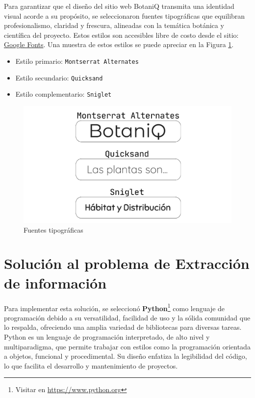 Para garantizar que el diseño del sitio web BotaniQ transmita una identidad visual acorde a su 
propósito, se seleccionaron fuentes tipográficas que equilibran profesionalismo, claridad y frescura, 
alineadas con la temática botánica y científica del proyecto. Estos estilos son accesibles
libre de costo desde el sitio: \href{https://fonts.google.com/}{Google Fonts}. 
Una muestra de estos estilos se puede apreciar en la Figura \ref{fig:fonts}.

\begin{itemize}
    \item Estilo primario: \texttt{Montserrat Alternates}
    \item Estilo secundario: \texttt{Quicksand}
    \item Estilo complementario: \texttt{Sniglet}
\end{itemize}


\begin{figure}[ht!]
    \centering
    \includegraphics[width=1\textwidth]{Images/fonts.png}
    \caption{Fuentes tipográficas}
    \label{fig:fonts}
\end{figure}



\section{Solución al problema de Extracción de información}
Para implementar esta solución, se seleccionó 
\textbf{Python}\footnote{Visitar en \url{https://www.python.org}} como lenguaje de programación 
debido a su versatilidad, facilidad de uso y la sólida comunidad que lo respalda, ofreciendo 
una amplia variedad de bibliotecas para diversas tareas. Python es un lenguaje de 
programación interpretado, de alto nivel y multiparadigma, que permite trabajar con estilos 
como la programación orientada a objetos, funcional y procedimental. Su diseño enfatiza la 
legibilidad del código, lo que facilita el desarrollo y mantenimiento de proyectos.

